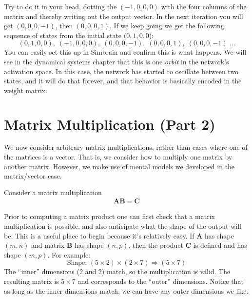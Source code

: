 \noindent Try to do it in your head, dotting the $(-1, 0,0,0)$ with the four columns of the matrix and thereby writing out the output vector. In the next iteration you will get $(0,0,0,-1)$, then $(0,0,0,1)$. If we keep going we get the following sequence of states from the initial state $(0,1,0,0$):
\begin{equation*}
(0,1,0,0),\; (-1,0,0,0),\; (0,0,0,-1),\; (0,0,0,1),\;  (0,0,0,-1)\; \dots
\end{equation*}
You can easily set this up in Simbrain and confirm this is what happens. We will see in the dynamical systems chapter  that this is one \emph{orbit} in the network's activation space. In this case, the network has started to oscillate between two states, and it will do that forever, and that behavior is basically encoded in the weight matrix.

\section{Matrix Multiplication (Part 2)}\label{matrixMultiplication}


We now consider arbitrary matrix multiplications, rather than cases where one of the matrices is a vector. That is, we consider how to multiply one matrix by another matrix. However, we make use of mental models we developed in the matrix/vector case.

Consider a matrix multiplication 
\begin{align*}
\mathbf{A}\mathbf{B} = \mathbf{C}
\end{align*}

Prior to computing a matrix product one can first check that a matrix multiplication is possible, and also anticipate what the shape of the output will be. This is a useful place to begin because it's relatively easy. If $\mathbf{A}$ has shape $(m, n)$ and matrix $\mathbf{B}$ has shape $(n, p)$, then the product $\mathbf{C}$ is defined and has shape $(m, p)$. For example: 
\[
\text{Shape: } (5 \times 2) \times (2 \times 7) \Rightarrow (5 \times 7)
\]
The ``inner'' dimensions (2 and 2) match, so the multiplication is valid. The resulting matrix is $5 \times 7$ and corresponds to the ``outer'' dimensions. Notice that as long as the inner dimensions match, we can have any outer dimensions we like. 

